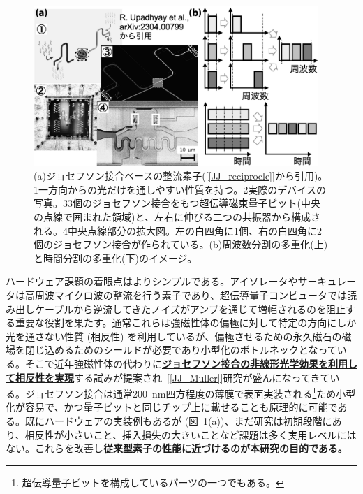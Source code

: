 \documentclass[11pt,a4j,dvipdfmx]{jarticle} 					%
\newcommand{\研究課題名}{誤り耐性量子コンピュータに向けた誤り訂正技術の開発(仮)}
\newcommand{\研究機関名}{東京大学}
\newcommand{\研究代表者氏名}{寺師弘二}
\newcommand{\研究期間の最終元号年度}{10}  %
\newcommand{\mybf}[1]{{\bfseries\sffamily#1}}
\newcommand{\maruone}{\raise0.2mm\hbox{\textcircled{\scriptsize{1}}}}
\newcommand{\marutwo}{\raise0.2mm\hbox{\textcircled{\scriptsize{2}}}}
\newcommand{\maruthree}{\raise0.2mm\hbox{\textcircled{\scriptsize{3}}}}
\newcommand{\marufour}{\raise0.2mm\hbox{\textcircled{\scriptsize{4}}}}
\begin{document}
\begin{figure}
	\begin{center}
		\vspace{-1cm}
		\includegraphics[width=10.8cm]{figs/hard.png}\vspace{-0.4cm}
		\caption{\small{(a)ジョセフソン接合ベースの整流素子([\ref{JJ_reciprocle}]から引用)。\maruone 一方向からの光だけを通しやすい性質を持つ。\marutwo 実際のデバイスの写真。\maruthree 3個のジョセフソン接合をもつ超伝導磁束量子ビット(中央の点線で囲まれた領域)と、左右に伸びる二つの共振器から構成される。\marufour 中央点線部分の拡大図。左の白四角に1個、右の白四角に2個のジョセフソン接合が作られている。(b)周波数分割の多重化(上)と時間分割の多重化(下)のイメージ。}
		\label{fig:hard}}\vspace{-0.7cm}
	\end{center}
\end{figure}

ハードウェア課題の着眼点はよりシンプルである。アイソレータやサーキュレータは高周波マイクロ波の整流を行う素子であり、超伝導量子コンピュータでは読み出しケーブルから逆流してきたノイズがアンプを通じて増幅されるのを阻止する重要な役割を果たす。通常これらは強磁性体の偏極に対して特定の方向にしか光を通さない性質 (相反性) を利用しているが、偏極させるための永久磁石の磁場を閉じ込めるためのシールドが必要であり小型化のボトルネックとなっている。そこで近年強磁性体の代わりに\mybf{\ul{ジョセフソン接合の非線形光学効果を利用して相反性を実現}}する試みが提案され~[\ref{JJ_Muller}]研究が盛んになってきている。ジョセフソン接合は通常200~{nm}四方程度の薄膜で表面実装される\footnote{超伝導量子ビットを構成しているパーツの一つでもある。}ため小型化が容易で、かつ量子ビットと同じチップ上に載せることも原理的に可能である。既にハードウェアの実装例もあるが (図~\ref{fig:hard}(a))、まだ研究は初期段階にあり、相反性が小さいこと、挿入損失の大きいことなど課題は多く実用レベルにはない。これらを改善し\mybf{\ul{従来型素子の性能に近づけるのが本研究の目的である。}}
\end{document}
